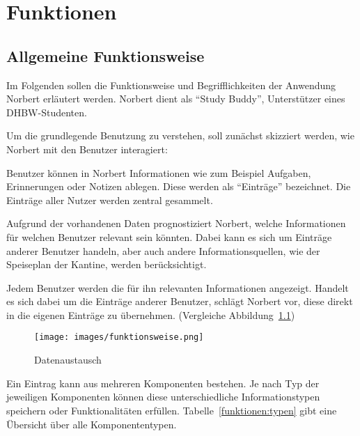 \chapter{Funktionen}

\section{Allgemeine Funktionsweise}

Im Folgenden sollen die Funktionsweise und Begrifflichkeiten der Anwendung Norbert erläutert werden.
Norbert dient als \enquote{Study Buddy}, Unterstützer eines DHBW-Studenten.

Um die grundlegende Benutzung zu verstehen, soll zunächst skizziert werden, wie Norbert mit den Benutzer interagiert:

Benutzer können in Norbert Informationen wie zum Beispiel Aufgaben, Erinnerungen oder Notizen ablegen. Diese werden als \enquote{Einträge} bezeichnet. Die Einträge aller Nutzer werden zentral gesammelt.

Aufgrund der vorhandenen Daten prognostiziert Norbert, welche Informationen für welchen Benutzer relevant sein könnten. Dabei kann es sich um Einträge anderer Benutzer handeln, aber auch andere Informationsquellen, wie der Speiseplan der Kantine, werden berücksichtigt.

Jedem Benutzer werden die für ihn relevanten Informationen angezeigt. Handelt es sich dabei um die Einträge anderer Benutzer, schlägt Norbert vor, diese direkt in die eigenen Einträge zu übernehmen. (Vergleiche Abbildung~\ref{funktionen:datenaustausch})

\begin{figure}[H]
    \centering
    \texttt{[image: images/funktionsweise.png]}
    \caption{Datenaustausch}
    \label{funktionen:datenaustausch}
\end{figure}

Ein Eintrag kann aus mehreren Komponenten bestehen. Je nach Typ der jeweiligen Komponenten können diese unterschiedliche Informationstypen speichern oder Funktionalitäten erfüllen. Tabelle~\ref{funktionen:typen} gibt eine Übersicht über alle Komponententypen.

